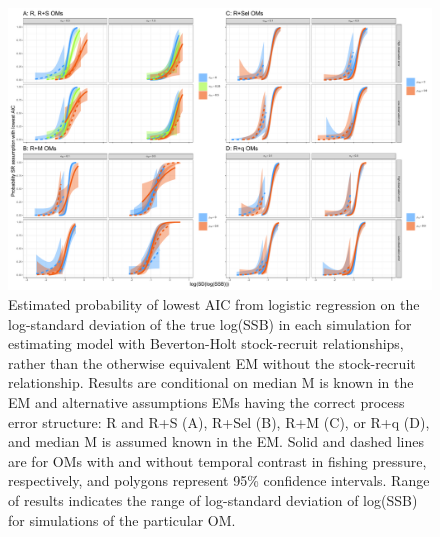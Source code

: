 \documentclass[
  12pt,
]{article}
\begin{document}
\begin{landscape}
\begin{figure}
\begin{center}
\includegraphics[height = 0.8\textheight]{sr_aic_plots_rev}
\end{center}
\caption{Estimated probability of lowest AIC from logistic regression on the log-standard deviation of the true log(SSB) in each simulation for estimating model with Beverton-Holt stock-recruit relationships, rather than the otherwise equivalent EM without the stock-recruit relationship. Results are conditional on median M is known in the EM and alternative assumptions EMs having the correct process error structure: R and R+S (A), R+Sel (B), R+M (C), or R+q (D), and median M is assumed known in the EM. Solid and dashed lines are for OMs with and without temporal contrast in fishing pressure, respectively, and polygons represent 95\% confidence intervals. Range of results indicates the range of log-standard deviation of log(SSB) for simulations of the particular OM.}\label{sr_aic}
\end{figure}
\end{landscape}
\end{document}
